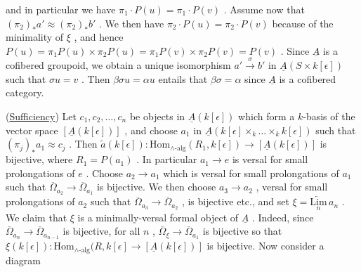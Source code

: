 \begin{center}
\end{center}
and in particular we have $\pi_1\cdot P(u) = \pi_1\cdot P(v)$ . Assume now that $(\pi_2)_*a' \approx (\pi_2)_*b'$ . We then have $\pi_2\cdot P(u) = \pi_2\cdot P(v)$ because of the minimality of
$\xi$ , and hence  $P(u) = \pi_1 P(u)\times \pi_2 P(u) = \pi_1 P(v)\times \pi_2 P(v) = P(v)$  . Since  $\underline{A}$  is a cofibered groupoid, we obtain a unique isomorphism  $a' \overset{\sigma}{\to} b'$  in $\underline{A}(S\times k[\epsilon])$  such that  $\sigma u = v$  . Then  $\beta\sigma u = \alpha u$  entails that  $\beta\sigma= \alpha$  since  $\underline{A}$ is a cofibered category.

(\underline{Sufficiency}) Let  $c_1,c_2,\dots,c_n$  be objects in  $\underline{A}(k[\epsilon])$  which form a $k$-basis of the vector space  $[\underline{A}(k[\epsilon])]$  , and choose  $a_1$  in  $\underline{A}(k[\epsilon]\times_k\dots\times_k k[\epsilon])$ such that  $(\pi_j)_* a_1 \approx c_j$  . Then  $\tilde{a}(k[\epsilon]) : \mathrm{Hom}_{\wedge\text{-alg}}(R_1,k[\epsilon]) \to [\underline{A}(k[\epsilon])]$  is bijective, where  $R_1 = P(a_1)$  . In particular  $a_1 \to e$  is versal for small prolongations of  $e$  . Choose  $a_2 \to a_1$  which is versal for small prolongations of  $a_1$ such that  $\overline{\Omega}_{a_2} \to \overline{\Omega}_{a_1}$  is bijective. We then choose  $a_3 \to a_2$  , versal for small prolongations of  $a_2$  such that  $\overline{\Omega}_{a_3} \to \overline{\Omega}_{a_2}$  , is bijective etc., and set $\xi = \underset{n}{\underleftarrow{\mathrm{Lim}}}\, a_n$  . We claim that  $\xi$  is a minimally-versal formal object of  $\underline{A}$  . Indeed, since  $\overline{\Omega}_{a_n} \to \overline{\Omega}_{a_{n-1}}$  is bijective, for all  $n$  ,  $\overline{\Omega}_{\xi} \to \overline{\Omega}_{a_1}$  is bijective so that $\xi(k[\epsilon]) : \mathrm{Hom}_{\wedge\text{-alg}}(R,k[\epsilon] \to [\underline{A}(k[\epsilon])]$  is bijective. Now consider a diagram

